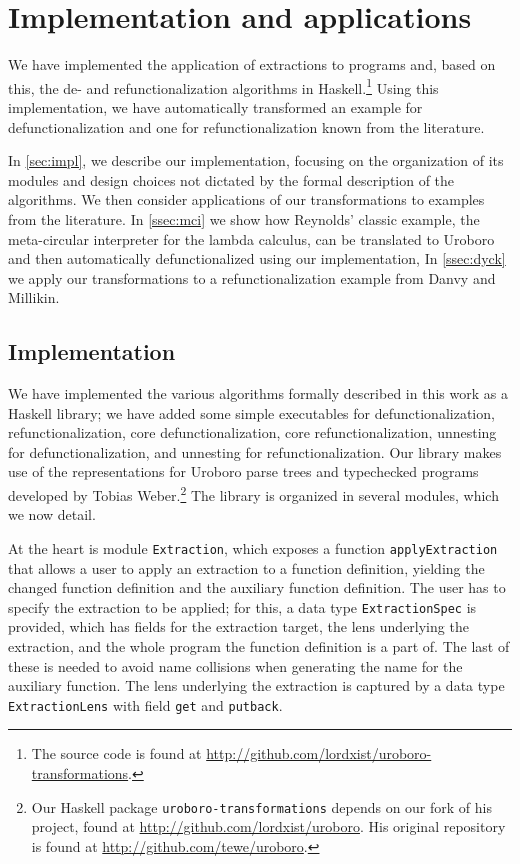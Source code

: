 \chapter{Implementation and applications}

We have implemented the application of extractions to programs and, based on this, the de- and refunctionalization algorithms in Haskell.\footnote{The source code is found at \url{http://github.com/lordxist/uroboro-transformations}.} Using this implementation, we have automatically transformed an example for defunctionalization and one for refunctionalization known from the literature.

In \autoref{sec:impl}, we describe our implementation, focusing on the organization of its modules and design choices not dictated by the formal description of the algorithms. We then consider applications of our transformations to examples from the literature. In \autoref{ssec:mci} we show how Reynolds' classic example, the meta-circular interpreter for the lambda calculus, can be translated to Uroboro and then automatically defunctionalized using our implementation, In \autoref{ssec:dyck} we apply our transformations to a refunctionalization example from Danvy and Millikin.

\section{Implementation}
\label{sec:impl}

We have implemented the various algorithms formally described in this work as a Haskell library; we have added some simple executables for defunctionalization, refunctionalization, core defunctionalization, core refunctionalization, unnesting for defunctionalization, and unnesting for refunctionalization. Our library makes use of the representations for Uroboro parse trees and typechecked programs developed by Tobias Weber.\footnote{Our Haskell package \texttt{uroboro-transformations} depends on our fork of his project, found at \url{http://github.com/lordxist/uroboro}. His original repository is found at \url{http://github.com/tewe/uroboro}.} The library is organized in several modules, which we now detail.

At the heart is module \texttt{Extraction}, which exposes a function \texttt{applyExtraction} that allows a user to apply an extraction to a function definition, yielding the changed function definition and the auxiliary function definition. The user has to specify the extraction to be applied; for this, a data type \texttt{ExtractionSpec} is provided, which has fields for the extraction target, the lens underlying the extraction, and the whole program the function definition is a part of. The last of these is needed to avoid name collisions when generating the name for the auxiliary function. The lens underlying the extraction is captured by a data type \texttt{ExtractionLens} with field \texttt{get} and \texttt{putback}.

